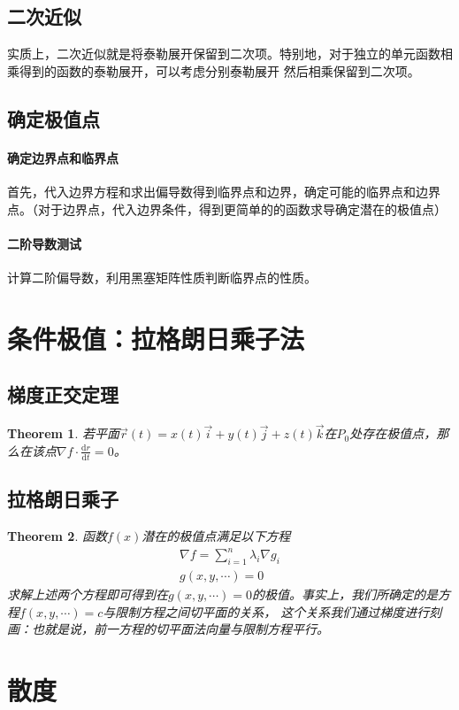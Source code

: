 \documentclass[12pt,a4paper,UTF8]{ctexbook}
\theoremstyle{plain}
\newtheorem{theorem}{\indent Theorem}[section]
\begin{document}
\subsection{二次近似}
实质上，二次近似就是将泰勒展开保留到二次项。特别地，对于独立的单元函数相乘得到的函数的泰勒展开，可以考虑分别泰勒展开
然后相乘保留到二次项。
\subsection{确定极值点}
\paragraph{确定边界点和临界点}首先，代入边界方程和求出偏导数得到临界点和边界，确定可能的临界点和边界点。（对于边界点，代入边界条件，得到更简单的的函数求导确定潜在的极值点）
\paragraph{二阶导数测试}计算二阶偏导数，利用黑塞矩阵性质判断临界点的性质。
\section{条件极值：拉格朗日乘子法}
\subsection{梯度正交定理}
\begin{theorem}
若平面$\vec r(t)=x(t)\vec i+y(t)\vec j + z(t)\vec k$在$P_0$处存在极值点，那么在该点$\nabla f\cdot \frac{\mathrm d r}{\mathrm d t}=0$。
\end{theorem}
\subsection{拉格朗日乘子}
\begin{theorem}
函数$f(x)$潜在的极值点满足以下方程
\begin{align*} 
&\nabla f=\sum_{i=1}^n\lambda_i\nabla g_i&\\
&g(x,y,\cdots)=0&
\end{align*}
求解上述两个方程即可得到在$g(x,y,\cdots)=0$的极值。事实上，我们所确定的是方程$f(x,y,\cdots)=c$与限制方程之间切平面的关系，
这个关系我们通过梯度进行刻画：也就是说，前一方程的切平面法向量与限制方程平行。
\end{theorem}
\section{散度}
\end{document}
